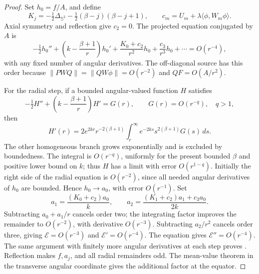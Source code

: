 \begin{proof}
Set \(h_0=f/A\), and define
\begin{equation}
 K_j=-\tfrac12\Delta_{\mathbb S^2}
       -\tfrac12(\beta-j)(\beta-j+1),\qquad
 c_m=U_m+\lambda\langle\phi,W_m\phi\rangle.
 \label{eq:angular-recursion-operators}
\end{equation}
Axial symmetry and reflection give \(c_2=0\).
The projected equation conjugated by \(A\) is
\begin{equation}
 -\tfrac12h_0''+
 \left(k-\frac{\beta+1}{r}\right)h_0'
 +\frac{K_0+c_2}{r^2}h_0+\frac{c_3}{r^3}h_0+\cdots
 =O(r^{-4}),
 \label{eq:projected-radial-equation}
\end{equation}
with any fixed number of angular derivatives.
The off-diagonal source has this order because
\(\|PWQ\|=\|QW\phi\|=O(r^{-2})\) and \(QF=O(A/r^2)\).

For the radial step, if a bounded angular-valued function \(H\)
satisfies
\[
 -\tfrac12H''+\left(k-\frac{\beta+1}{r}\right)H'=G(r),
 \qquad G(r)=O(r^{-q}),\quad q>1,
 \]
then
\begin{equation}
 H'(r)=2e^{2kr}r^{-2(\beta+1)}
       \int_r^\infty e^{-2ks}s^{2(\beta+1)}G(s)\,ds.
 \label{eq:radial-integrating-factor}
\end{equation}
The other homogeneous branch grows exponentially and is excluded
by boundedness.  The integral is \(O(r^{-q})\), uniformly for the
present bounded \(\beta\) and positive lower bound on \(k\);
thus \(H\) has a limit with error \(O(r^{1-q})\).
Initially the right side of the radial equation is \(O(r^{-2})\),
since all needed angular derivatives of \(h_0\) are bounded.
Hence \(h_0\to a_0\), with error \(O(r^{-1})\).
Set
\begin{equation}
 a_1=\frac{(K_0+c_2)a_0}{k},\qquad
 a_2=\frac{(K_1+c_2)a_1+c_3a_0}{2k}.
 \label{eq:scalar-channel-recursion}
\end{equation}
Subtracting \(a_0+a_1/r\) cancels order two; the integrating factor
improves the remainder to \(O(r^{-2})\), with derivative
\(O(r^{-3})\).  Subtracting \(a_2/r^2\) cancels order three,
giving \(\mathcal E=O(r^{-3})\) and \(\mathcal E'=O(r^{-4})\).
The equation gives \(\mathcal E''=O(r^{-4})\).
The same argument with finitely more angular derivatives at each
step proves .
Reflection makes \(f,a_j\), and all radial remainders odd.
The mean-value theorem in the transverse angular coordinate gives
the additional factor at the equator.


\end{proof}
